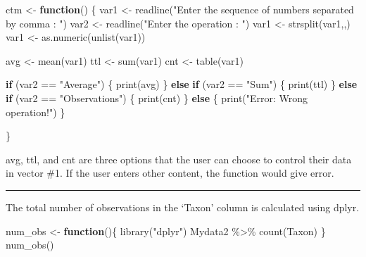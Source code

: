 \documentclass[
]{article}
\newenvironment{Shaded}{\begin{snugshade}}{\end{snugshade}}
\newcommand{\ControlFlowTok}[1]{\textcolor[rgb]{0.13,0.29,0.53}{\textbf{#1}}}
\newcommand{\FunctionTok}[1]{\textcolor[rgb]{0.00,0.00,0.00}{#1}}
\newcommand{\NormalTok}[1]{#1}
\newcommand{\OtherTok}[1]{\textcolor[rgb]{0.56,0.35,0.01}{#1}}
\newcommand{\SpecialCharTok}[1]{\textcolor[rgb]{0.00,0.00,0.00}{#1}}
\newcommand{\StringTok}[1]{\textcolor[rgb]{0.31,0.60,0.02}{#1}}
\begin{document}
\begin{Shaded}
\begin{Highlighting}[]
\NormalTok{ctm }\OtherTok{\textless{}{-}} \ControlFlowTok{function}\NormalTok{() \{}
\NormalTok{  var1 }\OtherTok{\textless{}{-}} \FunctionTok{readline}\NormalTok{(}\StringTok{"Enter the sequence of numbers separated by comma : "}\NormalTok{)}
\NormalTok{  var2 }\OtherTok{\textless{}{-}} \FunctionTok{readline}\NormalTok{(}\StringTok{"Enter the operation : "}\NormalTok{)}
\NormalTok{  var1 }\OtherTok{\textless{}{-}} \FunctionTok{strsplit}\NormalTok{(var1,}\StringTok{\textquotesingle{},\textquotesingle{}}\NormalTok{)}
\NormalTok{  var1 }\OtherTok{\textless{}{-}} \FunctionTok{as.numeric}\NormalTok{(}\FunctionTok{unlist}\NormalTok{(var1))}
  
\NormalTok{  avg }\OtherTok{\textless{}{-}} \FunctionTok{mean}\NormalTok{(var1)}
\NormalTok{  ttl }\OtherTok{\textless{}{-}} \FunctionTok{sum}\NormalTok{(var1)}
\NormalTok{  cnt }\OtherTok{\textless{}{-}} \FunctionTok{table}\NormalTok{(var1)}
  
  \ControlFlowTok{if}\NormalTok{ (var2 }\SpecialCharTok{==} \StringTok{"Average"}\NormalTok{) \{}
    \FunctionTok{print}\NormalTok{(avg)}
\NormalTok{  \} }\ControlFlowTok{else} \ControlFlowTok{if}\NormalTok{ (var2 }\SpecialCharTok{==} \StringTok{"Sum"}\NormalTok{) \{}
    \FunctionTok{print}\NormalTok{(ttl)}
\NormalTok{  \} }\ControlFlowTok{else} \ControlFlowTok{if}\NormalTok{ (var2 }\SpecialCharTok{==} \StringTok{"Observations"}\NormalTok{) \{}
    \FunctionTok{print}\NormalTok{(cnt)}
\NormalTok{  \} }\ControlFlowTok{else}\NormalTok{ \{}
    \FunctionTok{print}\NormalTok{(}\StringTok{"Error: Wrong operation!"}\NormalTok{)}
\NormalTok{  \}}
  
\NormalTok{\}}
\end{Highlighting}
\end{Shaded}

avg, ttl, and cnt are three options that the user can choose to control
their data in vector \#1. If the user enters other content, the function
would give error.

\begin{center}\rule{0.5\linewidth}{0.5pt}\end{center}

The total number of observations in the `Taxon' column is calculated
using dplyr.

\begin{Shaded}
\begin{Highlighting}[]
\NormalTok{num\_obs }\OtherTok{\textless{}{-}} \ControlFlowTok{function}\NormalTok{()\{}
  \FunctionTok{library}\NormalTok{(}\StringTok{"dplyr"}\NormalTok{)}
\NormalTok{  Mydata2 }\SpecialCharTok{\%\textgreater{}\%} \FunctionTok{count}\NormalTok{(Taxon)}
\NormalTok{\}}
\FunctionTok{num\_obs}\NormalTok{()}
\end{Highlighting}
\end{Shaded}
\end{document}
